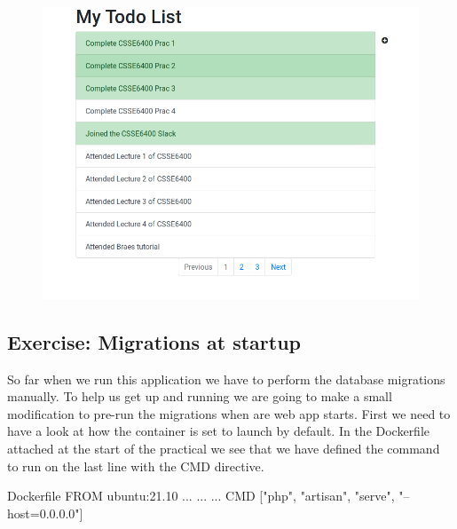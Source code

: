 \documentclass{csse4400}
\begin{document}
\begin{figure}[ht]
\includegraphics[width=\textwidth]{images/todoapp}
\end{figure}


\subsection{Exercise: Migrations at startup}

So far when we run this application we have to perform the database migrations manually. 
To help us get up and running we are going to make a small modification to pre-run the migrations when are web app starts.
First we need to have a look at how the container is set to launch by default.
In the Dockerfile attached at the start of the practical we see that we have defined the command to run on the last line with the CMD directive.

\begin{code}[language=docker]{Dockerfile}
  FROM ubuntu:21.10
  ... 
  ... 
  ...
  CMD ["php", "artisan", "serve", "--host=0.0.0.0"]
\end{code}
\end{document}
